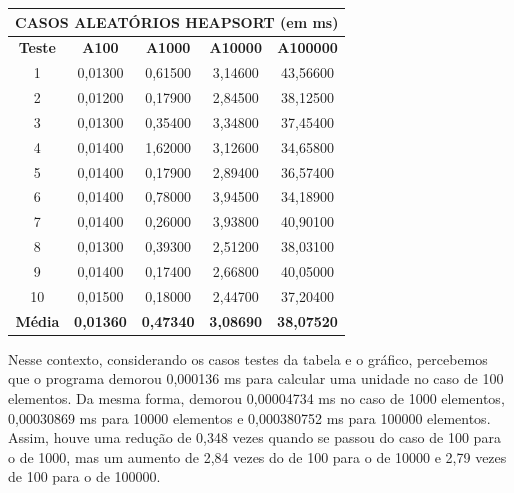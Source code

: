 \documentclass[a4paper, 12pt]{article}
\begin{document}
\begin{minipage}{1.05\textwidth}
\begin{minipage}[c]{0.46\textwidth}
\begin{tabular}{ccccc}
 \multicolumn{ 5}{c}{{\bf CASOS ALEATÓRIOS HEAPSORT (em ms)}} \\
\hline
{\bf Teste} & {\bf A100} & {\bf A1000} & {\bf A10000} & {\bf A100000} \\
\hline
         1 &    0,01300 &    0,61500 &    3,14600 &   43,56600 \\
\hline
         2 &    0,01200 &    0,17900 &    2,84500 &   38,12500 \\
\hline
         3 &    0,01300 &    0,35400 &    3,34800 &   37,45400 \\
\hline
         4 &    0,01400 &    1,62000 &    3,12600 &   34,65800 \\
\hline
         5 &    0,01400 &    0,17900 &    2,89400 &   36,57400 \\
\hline
         6 &    0,01400 &    0,78000 &    3,94500 &   34,18900 \\
\hline
         7 &    0,01400 &    0,26000 &    3,93800 &   40,90100 \\
\hline
         8 &    0,01300 &    0,39300 &    2,51200 &   38,03100 \\
\hline
         9 &    0,01400 &    0,17400 &    2,66800 &   40,05000 \\
\hline
        10 &    0,01500 &    0,18000 &    2,44700 &   37,20400 \\
\hline
{\bf Média} & {\bf 0,01360} & {\bf 0,47340} & {\bf 3,08690} & {\bf 38,07520} \\
\hline
\end{tabular}  
\end{minipage}\hfill
\begin{minipage}[c]{0.49\textwidth}
\centering
{}
\end{minipage}
\end{minipage}\hfill
\vspace{0.8cm}

Nesse contexto, considerando os casos testes da tabela e o gráfico, percebemos que o programa demorou 0,000136 ms para calcular uma unidade no caso de 100 elementos. Da mesma forma, demorou 0,00004734 ms no caso de 1000 elementos, 0,00030869 ms para 10000 elementos e 0,000380752 ms para 100000 elementos. Assim, houve uma redução de 0,348 vezes quando se passou do caso de 100 para o de 1000, mas um aumento de 2,84 vezes do de 100 para o de 10000 e 2,79 vezes de 100 para o de 100000.
\end{document}
